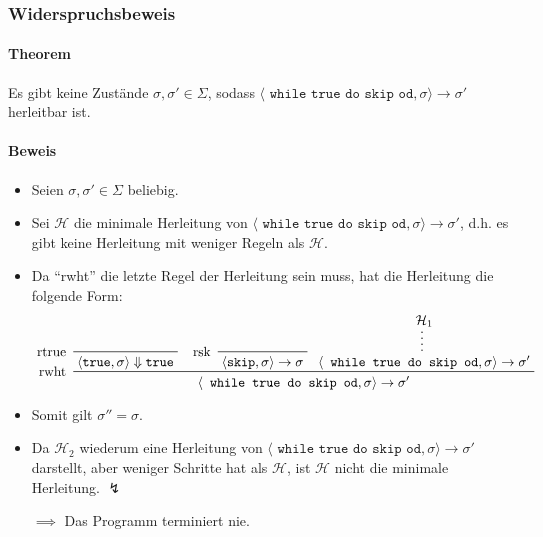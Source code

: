 															\subsubsection{Widerspruchsbeweis}
																\paragraph{Theorem}
																	Es gibt keine Zustände $ \sigma, \sigma' \in \Sigma $, sodass $ \langle \texttt{ while true do skip od}, \sigma \rangle \rightarrow \sigma' $ herleitbar ist.


																\paragraph{Beweis}
																	\begin{itemize}
																		\item Seien $ \sigma, \sigma' \in \Sigma $ beliebig.
																		\item Sei $ \mathcal{H} $ die minimale Herleitung von $ \langle \texttt{ while true do skip od}, \sigma \rangle \rightarrow \sigma' $, d.h. es gibt keine Herleitung mit weniger Regeln als $ \mathcal{H} $.
																		\item Da \enquote{rwht} die letzte Regel der Herleitung sein muss, hat die Herleitung die folgende Form:
																			\begin{equation*}
																				\prftree[l]
																				{ rwht }
																				{ \prftree[l]{ rtrue }{ \langle \texttt{true}, \sigma \rangle \Downarrow \texttt{true} } }
																				{ \prftree[l]{ rsk }{ \langle \texttt{skip}, \sigma \rangle \rightarrow \sigma } }
																				{ \prfsummary{\mathcal{H} _ 1}{ \langle \texttt{ while true do skip od}, \sigma \rangle \rightarrow \sigma' } }
																				{ \langle \texttt{ while true do skip od}, \sigma \rangle \rightarrow \sigma' }
																			\end{equation*}
																		\item Somit gilt $ \sigma'' = \sigma $.
																		\item Da $ \mathcal{H} _ 2 $ wiederum eine Herleitung von $ \langle \texttt{ while true do skip od}, \sigma \rangle \rightarrow \sigma' $ darstellt, aber weniger Schritte hat als $ \mathcal{H} $, ist $ \mathcal{H} $ nicht die minimale Herleitung. $ \lightning $
																		\item[$ \implies $] Das Programm terminiert nie.
																	\end{itemize}

